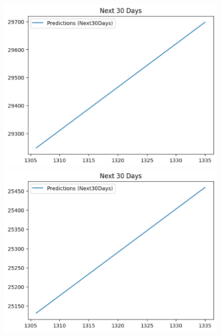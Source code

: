 \begin{figure}[H]
\begin{minipage}{0.15\textwidth}
    \includegraphics[width=1\textwidth]{resources/chapter-5/newdata/predicted/EIB_LinearRegression_7-3 30 DAYS.png}
    \end{minipage}
    \hfill
    \begin{minipage}{0.15\textwidth}
    \centering
    \includegraphics[width=1\textwidth]{resources/chapter-5/newdata/predicted/EIB_LinearRegression_8-2 30 DAYS.png}
    \end{minipage}
    \hfill
        \begin{minipage}{0.15\textwidth}
    \centering

\end{minipage}
\end{figure}
